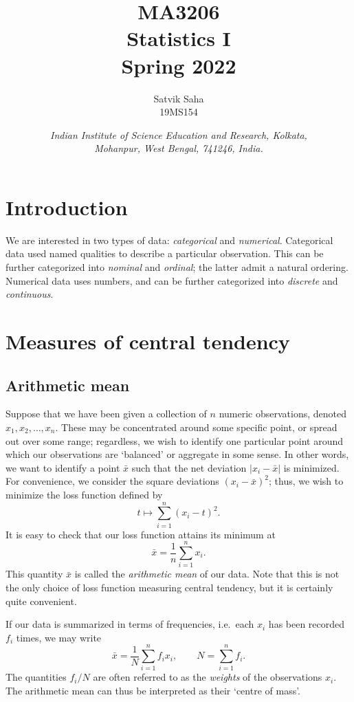 \documentclass[11pt]{article}
\title{
    \Large\textsc{MA3206} \\
    \Huge \textbf{Statistics I} \\
    \vspace{5pt}
    \Large{Spring 2022}
}
\author{
    \large Satvik Saha
    \\\textsc{\small 19MS154}
}
\date{\normalsize
    \textit{Indian Institute of Science Education and Research, Kolkata, \\
    Mohanpur, West Bengal, 741246, India.} \\
}
\theoremstyle{definition}
\theoremstyle{remark}
\numberwithin{equation}{section}
\begin{document}
    \maketitle

    \tableofcontents

    \section{Introduction}

    We are interested in two types of data: \emph{categorical} and \emph{numerical}.
    Categorical data used named qualities to describe a particular observation. This
    can be further categorized into \emph{nominal} and \emph{ordinal}; the latter
    admit a natural ordering. Numerical data uses numbers, and can be further
    categorized into \emph{discrete} and \emph{continuous}.
    
    \section{Measures of central tendency}

    \subsection{Arithmetic mean}
    
    Suppose that we have been given a collection of $n$ numeric observations, denoted
    $x_1, x_2, \dots, x_n$. These may be concentrated around some specific point, or
    spread out over some range; regardless, we wish to identify one particular point
    around which our observations are `balanced' or aggregate in some sense. In other
    words, we want to identify a point $\bar{x}$ such that the net deviation $|x_i -
    \bar{x}|$ is minimized. For convenience, we consider the square deviations $(x_i
    - \bar{x})^2$; thus, we wish to minimize the loss function defined by \[
        t \mapsto \sum_{i = 1}^n (x_i - t)^2.
    \] It is easy to check that our loss function attains its minimum at \[
        \bar{x} = \frac{1}{n}\sum_{i = 1}^n x_i.
    \] This quantity $\bar{x}$ is called the \emph{arithmetic mean} of our data.
    Note that this is not the only choice of loss function measuring central
    tendency, but it is certainly quite convenient.

    If our data is summarized in terms of frequencies, i.e.\ each $x_i$ has been
    recorded $f_i$ times, we may write \[
        \bar{x} = \frac{1}{N}\sum_{i = 1}^n f_ix_i, \qquad N = \sum_{i = 1}^n f_i.
    \] The quantities $f_i / N$ are often referred to as the \emph{weights} of the
    observations $x_i$. The arithmetic mean can thus be interpreted as their `centre
    of mass'. \\
\end{document}
